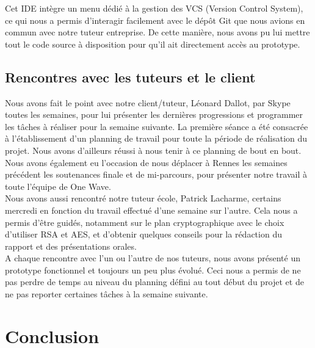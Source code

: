 \documentclass{report}
\begin{document}
\noindent
Cet IDE intègre un menu dédié à la gestion des VCS (Version Control System), ce qui nous a permis d'interagir facilement avec le dépôt Git que nous avions en commun avec notre tuteur entreprise. De cette manière, nous avons pu lui mettre tout le code source à disposition pour qu'il ait directement accès au prototype.


\section{Rencontres avec les tuteurs et le client}
Nous avons fait le point avec notre client/tuteur, Léonard Dallot, par Skype toutes les semaines, pour lui présenter les dernières progressions et programmer les tâches à réaliser pour la semaine suivante. La première séance a été consacrée à l'établissement d'un planning de travail pour toute la période de réalisation du projet. Nous avons d'ailleurs réussi à nous tenir à ce planning de bout en bout. Nous avons également eu l'occasion de nous déplacer à Rennes les semaines précédent les soutenances finale et de mi-parcours, pour présenter notre travail à toute l'équipe de One Wave.\\

Nous avons aussi rencontré notre tuteur école, Patrick Lacharme, certains mercredi en fonction du travail effectué d'une semaine sur l'autre. Cela nous a permis d'être guidés, notamment sur le plan cryptographique avec le choix d'utiliser RSA et AES, et d'obtenir quelques conseils pour la rédaction du rapport et des présentations orales.\\

A chaque rencontre avec l'un ou l'autre de nos tuteurs, nous avons présenté un prototype fonctionnel et toujours un peu plus évolué. Ceci nous a permis de ne pas perdre de temps au niveau du planning défini au tout début du projet et de ne pas reporter certaines tâches à la semaine suivante.



\chapter*{Conclusion}
\end{document}
